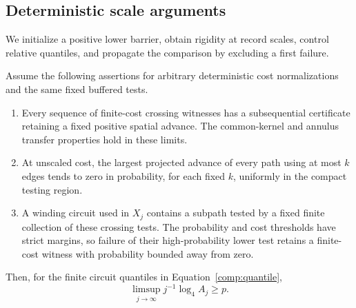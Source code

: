 \subsection{Deterministic scale arguments}

We initialize a positive lower barrier, obtain rigidity at record scales,
control relative quantiles, and propagate the comparison by excluding a
first failure.

\begin{proposition}
\label{comp:initial-growth}
Assume the following assertions for arbitrary deterministic cost
normalizations and the same fixed buffered tests.
\begin{enumerate}[label=(\alph*)]
\item Every sequence of finite-cost crossing witnesses has a
subsequential certificate retaining a fixed positive spatial advance.
The common-kernel and annulus transfer properties hold in these limits.
\item At unscaled cost, the largest projected advance of every path
using at most $k$ edges tends to zero in probability, for each fixed
$k$, uniformly in the compact testing region.
\item A winding circuit used in $X_j$ contains a subpath tested by a
fixed finite collection of these crossing tests.  The probability and
cost thresholds have strict margins, so failure of their high-probability
lower test retains a finite-cost witness with probability bounded away
from zero.
\end{enumerate}
Then, for the finite circuit quantiles in Equation~\eqref{comp:quantile},
\[
 \limsup_{j\to\infty}j^{-1}\log_4A_j\ge p.
\]
\end{proposition}

